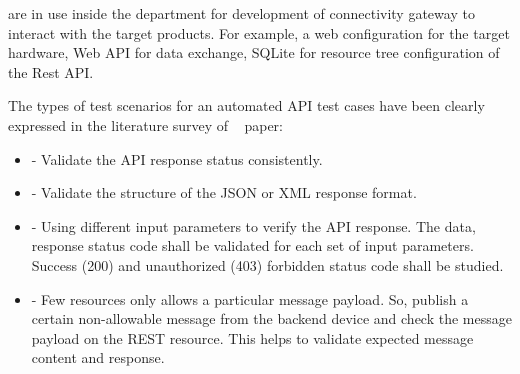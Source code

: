 are in use inside the department for development of connectivity gateway to interact with the target products. For example, a web configuration for the target hardware, Web \ac{API} for data exchange, SQLite for resource tree configuration of the Rest \ac{API}. 


The types of test scenarios for an automated API test cases have been clearly expressed in the literature survey of ~\parencite{sharma2018automated} paper:
\begin{itemize}
\item {} - Validate the API response status consistently.
\item {} - Validate the structure of the JSON or XML response format.
\item {} - Using different input parameters to verify the API response. The data, response status code shall be validated for each set of input parameters. Success (200) and unauthorized (403) forbidden status code shall be studied.
\item {} - Few resources only allows a particular message payload. So, publish a certain non-allowable message from the backend device and check the message payload on the REST resource. This helps to validate expected message content and response.
\end{itemize}